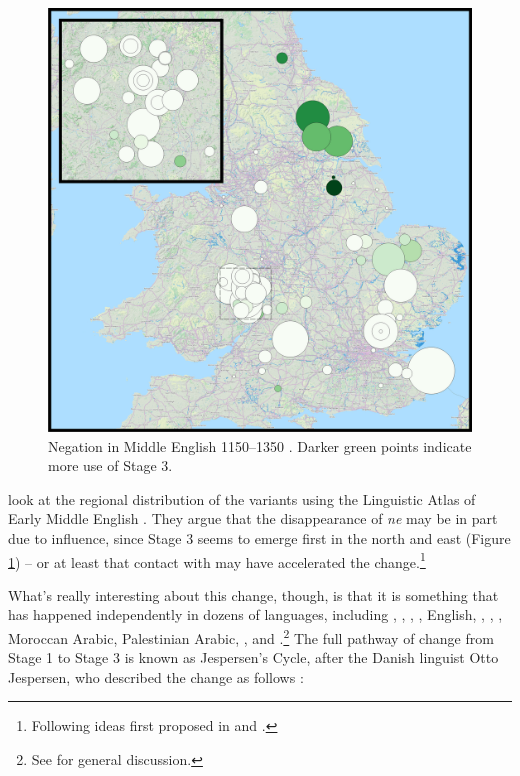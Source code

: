 \begin{figure}
    \centering
    \includegraphics[scale=0.082]{chapters/img/negation-overview.png}
    \caption{Negation in Middle English 1150--1350 \citep[182]{WalkdenMorrison2017}. Darker green points indicate more use of Stage 3.}
    \label{fig:OE-ME-negation}
\end{figure}

\citet{WalkdenMorrison2017} look at the regional distribution of the variants using the Linguistic Atlas of Early Middle English \citep{LAEME}. They argue that the disappearance of \emph{ne} may be in part due to  influence, since Stage 3 seems to emerge first in the north and east (Figure \ref{fig:OE-ME-negation}) -- or at least that contact with  may have accelerated the change.\footnote{Following ideas first proposed in \citet{Iyeiri1992,Iyeiri2001} and \citet{Ingham2008}.}

What's really interesting about this change, though, is that it is something that has happened independently in dozens of languages, including , , , , English, , , , Moroccan Arabic, Palestinian Arabic, , and .\footnote{See \citet{WillisLucasBreitbarth2013} for general discussion.} The full pathway of change from Stage 1 to Stage 3 is known as Jespersen's Cycle, after the Danish linguist Otto Jespersen, who described the change as follows \citep[4]{Jespersen1917}:

